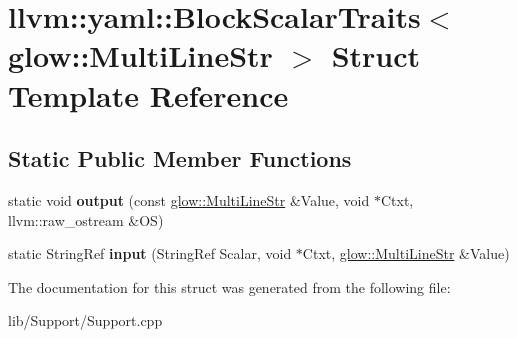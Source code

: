 \hypertarget{structllvm_1_1yaml_1_1_block_scalar_traits_3_01glow_1_1_multi_line_str_01_4}{}\section{llvm\+:\+:yaml\+:\+:Block\+Scalar\+Traits$<$ glow\+:\+:Multi\+Line\+Str $>$ Struct Template Reference}
\label{structllvm_1_1yaml_1_1_block_scalar_traits_3_01glow_1_1_multi_line_str_01_4}
\subsection*{Static Public Member Functions}
\begin{DoxyCompactItemize}
\item 
\mbox{\label{structllvm_1_1yaml_1_1_block_scalar_traits_3_01glow_1_1_multi_line_str_01_4_a366bb8f337a2c517708908968f9b9deb}} 
static void {\bfseries output} (const \hyperlink{structglow_1_1_multi_line_str}{glow\+::\+Multi\+Line\+Str} \&Value, void $\ast$Ctxt, llvm\+::raw\+\_\+ostream \&OS)
\item 
\mbox{\label{structllvm_1_1yaml_1_1_block_scalar_traits_3_01glow_1_1_multi_line_str_01_4_ad24db882d125aaaf6d40203e8711c8e2}} 
static String\+Ref {\bfseries input} (String\+Ref Scalar, void $\ast$Ctxt, \hyperlink{structglow_1_1_multi_line_str}{glow\+::\+Multi\+Line\+Str} \&Value)
\end{DoxyCompactItemize}


The documentation for this struct was generated from the following file\+:\begin{DoxyCompactItemize}
\item 
lib/\+Support/Support.\+cpp\end{DoxyCompactItemize}
